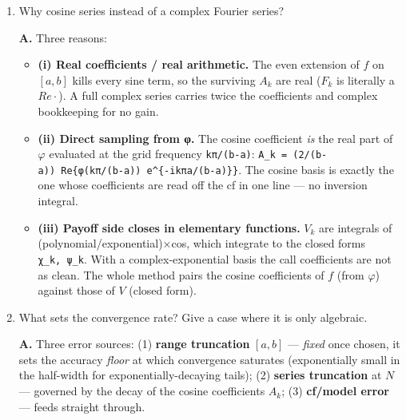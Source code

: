 \documentclass[
  11pt,
]{article}
\providecommand{\tightlist}{%
  \setlength{\itemsep}{0pt}\setlength{\parskip}{0pt}}
\begin{document}
\begin{enumerate}
  \textbf{Diagnostic signature} (this is the tell): the error
  \emph{grows} as \(T→0\) and does \emph{not} improve when \(N\)
  increases. That distinguishes a \emph{range} error (a fixed accuracy
  floor) from a \emph{series} error (curable by more terms).

  \textbf{Assignment-2 fix:} the truncation range was too narrow at
  short maturities because \(c2\) was tiny. I (i) raised \(L\) at short
  \(T\), (ii) imposed a minimum half-width floor so \(b−a\) cannot
  collapse (equivalently kept a \(√c4\)-type term), and (iii) made sure
  the range was computed to cover the entire spot/strike grid actually
  being priced, not a single point. After that the error stopped growing
  as \(T→0\) and reverted to exponential decay in \(N\).
\item
  Why cosine series instead of a complex Fourier series?

  \textbf{A.} Three reasons:

  \begin{itemize}
  \tightlist
  \item
    \textbf{(i) Real coefficients / real arithmetic.} The even extension
    of \(f\) on \([a,b]\) kills every sine term, so the surviving
    \(A_k\) are real (\(F_k\) is literally a \(Re{·}\)). A full complex
    series carries twice the coefficients and complex bookkeeping for no
    gain.
  \item
    \textbf{(ii) Direct sampling from φ.} The cosine coefficient
    \emph{is} the real part of \(φ\) evaluated at the grid frequency
    \texttt{kπ/(b-a)}:
    \texttt{A\_k\ =\ (2/(b-a))\ Re\{φ(kπ/(b-a))\ e\^{}\{-ikπa/(b-a)\}\}}.
    The cosine basis is exactly the one whose coefficients are read off
    the cf in one line --- no inversion integral.
  \item
    \textbf{(iii) Payoff side closes in elementary functions.} \(V_k\)
    are integrals of (polynomial/exponential)×cos, which integrate to
    the closed forms \texttt{χ\_k,\ ψ\_k}. With a complex-exponential
    basis the call coefficients are not as clean. The whole method pairs
    the cosine coefficients of \(f\) (from \(φ\)) against those of \(V\)
    (closed form).
  \end{itemize}
\item
  What sets the convergence rate? Give a case where it is only
  algebraic.

  \textbf{A.} Three error sources: (1) \textbf{range truncation}
  \([a,b]\) --- \emph{fixed} once chosen, it sets the accuracy
  \emph{floor} at which convergence saturates (exponentially small in
  the half-width for exponentially-decaying tails); (2) \textbf{series
  truncation} at \(N\) --- governed by the decay of the cosine
  coefficients \(A_k\); (3) \textbf{cf/model error} --- feeds straight
  through.


\end{enumerate}
\end{document}
